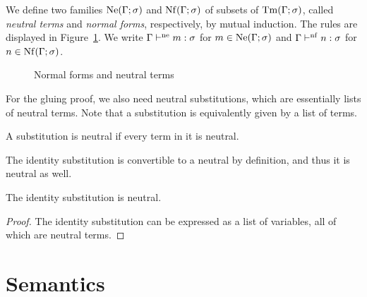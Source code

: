 \begin{defn}
We define two families $\mathrm{Ne}(\Gamma; \sigma)$ and $\mathrm{Nf}(\Gamma; \sigma)$ of subsets of $\mathrm{Tm}(\Gamma; \sigma)$, called \emph{neutral terms} and \emph{normal forms}, respectively, by mutual induction. The rules are displayed in Figure~\ref{fig:stlc2-normal-forms}. We write $\Gamma \vdash^{\mathrm{ne}} m : \sigma$ for $m \in \mathrm{Ne}(\Gamma; \sigma)$ and $\Gamma \vdash^{\mathrm{nf}} n : \sigma$ for $n \in \mathrm{Nf}(\Gamma; \sigma)$.

\begin{figure}[ht]
\caption{Normal forms and neutral terms}
\label{fig:stlc2-normal-forms}
\end{figure}
\end{defn}

For the gluing proof, we also need neutral substitutions, which are essentially lists of neutral terms. Note that a substitution is equivalently given by a list of terms.

\begin{defn}
A substitution is neutral if every term in it is neutral.
\end{defn}

The identity substitution is convertible to a neutral by definition, and thus it is neutral as well.

\begin{prop}
The identity substitution is neutral.
\end{prop}
\begin{proof}
The identity substitution can be expressed as a list of variables, all of which are neutral terms.
\end{proof}

\section{Semantics} \label{sec:stlc2-semantics}

